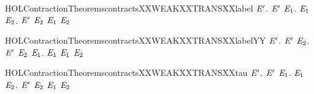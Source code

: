 \begin{SaveVerbatim}{HOLContractionTheoremscontractsXXWEAKXXTRANSXXlabel}
\HOLTokenTurnstile{} \HOLSymConst{\HOLTokenForall{}} \ensuremath{\HOLBoundVar{E}\sp{\prime{}}}.
       \ensuremath{\HOLBoundVar{E}\sp{\prime{}}} \HOLSymConst{\HOLTokenImp{}}
     \HOLSymConst{\HOLTokenForall{}} \ensuremath{\HOLBoundVar{E}\sb{\mathrm{1}}}.
        \HOLTokenWeakTransBegin{} \HOLTokenWeakTransEnd \ensuremath{\HOLBoundVar{E}\sb{\mathrm{1}}} \HOLSymConst{\HOLTokenImp{}} \HOLSymConst{\HOLTokenExists{}}\ensuremath{\HOLBoundVar{E}\sb{\mathrm{2}}}. \ensuremath{\HOLBoundVar{E}\sp{\prime{}}} \HOLTokenWeakTransBegin{} \HOLTokenWeakTransEnd \ensuremath{\HOLBoundVar{E}\sb{\mathrm{2}}} \HOLSymConst{\HOLTokenConj{}} \ensuremath{\HOLBoundVar{E}\sb{\mathrm{1}}}  \ensuremath{\HOLBoundVar{E}\sb{\mathrm{2}}}
\end{SaveVerbatim}
\newcommand{\HOLContractionTheoremscontractsXXWEAKXXTRANSXXlabel}{\UseVerbatim{HOLContractionTheoremscontractsXXWEAKXXTRANSXXlabel}}
\begin{SaveVerbatim}{HOLContractionTheoremscontractsXXWEAKXXTRANSXXlabelYY}
\HOLTokenTurnstile{} \HOLSymConst{\HOLTokenForall{}} \ensuremath{\HOLBoundVar{E}\sp{\prime{}}}.
       \ensuremath{\HOLBoundVar{E}\sp{\prime{}}} \HOLSymConst{\HOLTokenImp{}}
     \HOLSymConst{\HOLTokenForall{}} \ensuremath{\HOLBoundVar{E}\sb{\mathrm{2}}}.
       \ensuremath{\HOLBoundVar{E}\sp{\prime{}}} \HOLTokenWeakTransBegin{} \HOLTokenWeakTransEnd \ensuremath{\HOLBoundVar{E}\sb{\mathrm{2}}} \HOLSymConst{\HOLTokenImp{}} \HOLSymConst{\HOLTokenExists{}}\ensuremath{\HOLBoundVar{E}\sb{\mathrm{1}}}.  \HOLTokenWeakTransBegin{} \HOLTokenWeakTransEnd \ensuremath{\HOLBoundVar{E}\sb{\mathrm{1}}} \HOLSymConst{\HOLTokenConj{}}  \ensuremath{\HOLBoundVar{E}\sb{\mathrm{1}}} \ensuremath{\HOLBoundVar{E}\sb{\mathrm{2}}}
\end{SaveVerbatim}
\newcommand{\HOLContractionTheoremscontractsXXWEAKXXTRANSXXlabelYY}{\UseVerbatim{HOLContractionTheoremscontractsXXWEAKXXTRANSXXlabelYY}}
\begin{SaveVerbatim}{HOLContractionTheoremscontractsXXWEAKXXTRANSXXtau}
\HOLTokenTurnstile{} \HOLSymConst{\HOLTokenForall{}} \ensuremath{\HOLBoundVar{E}\sp{\prime{}}}.
       \ensuremath{\HOLBoundVar{E}\sp{\prime{}}} \HOLSymConst{\HOLTokenImp{}}
     \HOLSymConst{\HOLTokenForall{}}\ensuremath{\HOLBoundVar{E}\sb{\mathrm{1}}}.  \HOLTokenWeakTransBegin\HOLConst{\ensuremath{\tau}}\HOLTokenWeakTransEnd \ensuremath{\HOLBoundVar{E}\sb{\mathrm{1}}} \HOLSymConst{\HOLTokenImp{}} \HOLSymConst{\HOLTokenExists{}}\ensuremath{\HOLBoundVar{E}\sb{\mathrm{2}}}.  \ensuremath{\HOLBoundVar{E}\sp{\prime{}}} \ensuremath{\HOLBoundVar{E}\sb{\mathrm{2}}} \HOLSymConst{\HOLTokenConj{}} \ensuremath{\HOLBoundVar{E}\sb{\mathrm{1}}}  \ensuremath{\HOLBoundVar{E}\sb{\mathrm{2}}}
\end{SaveVerbatim}
